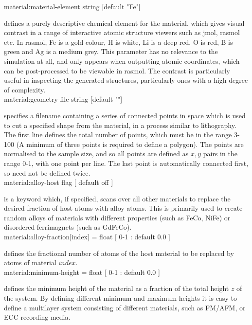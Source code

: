 {\zicf material:material-element string [default "Fe"]} defines a purely descriptive chemical element for the material, which gives visual contrast in a range of interactive atomic structure viewers such as jmol, rasmol etc. In rasmol, Fe is a gold colour, H is white, Li is a deep red, O is red, B is green and Ag is a medium grey. This parameter has no relevance to the simulation at all, and only appears when outputting atomic coordinates, which can be post-processed to be viewable in rasmol. The contrast is particularly useful in inspecting the generated structures, particularly ones with a high degree of complexity.\\

{\zicf material:geometry-file string [default ""]} specifies a filename containing a series of connected points in space which is used to cut a specified shape from the material, in a process similar to lithography. The first line defines the total number of points, which must be in the range 3-100 (A minimum of three points is required to define a polygon). The points are normalised to the sample size, and so all points are defined as $x,y$ pairs in the range 0-1, with one point per line. The last point is automatically connected first, so need not be defined twice.\\

{\zicf material:alloy-host flag [ default off ]} is a keyword which, if specified, scans over all other materials to replace the desired fraction of host atoms with alloy atoms. This is primarily used to create random alloys of materials with different properties (such as FeCo, NiFe) or disordered ferrimagnets (such as GdFeCo).\\


{\zicf material:alloy-fraction[index] = float [ 0-1 : default 0.0 ]} defines the fractional number of atoms of the host material to be replaced by atoms of material $index$.\\

{\zicf material:minimum-height = float [ 0-1 : default 0.0 ]} defines the minimum height of the material as a fraction of the total height $z$ of the system. By defining different minimum and maximum heights it is easy to define a multilayer system consisting of different materials, such as FM/AFM, or ECC recording media.

